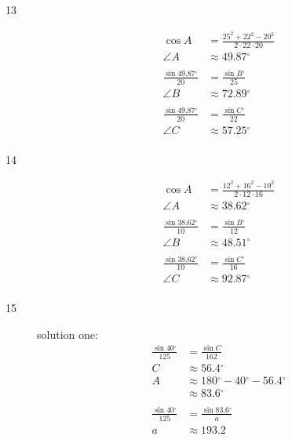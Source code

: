 \documentclass{exam}
\newcommand{\dg}{\ensuremath{^\circ}}
\begin{document}
\begin{description}
      \item[13]
        \begin{align*}
          \cos A &= \frac{25^2 + 22^2 - 20^2}{2 \cdot 22 \cdot 20} \\
          \angle A & \approx \boxed{ 49.87 \dg } \\
          \\
          \frac{\sin 49.87 \dg}{20} &= \frac{\sin B \dg}{25} \\
          \angle B & \approx \boxed{ 72.89 \dg } \\
          \\
          \frac{\sin 49.87 \dg}{20} &= \frac{\sin C \dg}{22} \\
          \angle C & \approx \boxed{ 57.25 \dg } \\
        \end{align*}

      \item[14]
        \begin{align*}
          \cos A   & = \frac{12^2 + 16^2 - 10^2}{2 \cdot 12 \cdot 16} \\
          \angle A & \approx \boxed{ 38.62 \dg } \\
          \\
          \frac{\sin 38.62 \dg}{10} &= \frac{\sin B \dg}{12} \\
          \angle B & \approx \boxed{ 48.51 \dg } \\
          \\
          \frac{\sin 38.62 \dg}{10} &= \frac{\sin C \dg}{16} \\
          \angle C & \approx \boxed{ 92.87 \dg } \\
        \end{align*}

      \item[15]
        solution one:
        \begin{align*}
          \frac{\sin 40 \dg}{125} & = \frac{\sin C}{162} \\
          C                       & \approx \boxed{ 56.4 \dg } \\
          A                       & \approx 180 \dg - 40 \dg - 56.4 \dg \\
                                  & \approx \boxed{ 83.6 \dg } \\
          \\
          \frac{\sin 40 \dg}{125} & = \frac{\sin 83.6 \dg}{a} \\
          a                       & \approx \boxed{ 193.2 } \\
        \end{align*}


\end{description}
\end{document}
